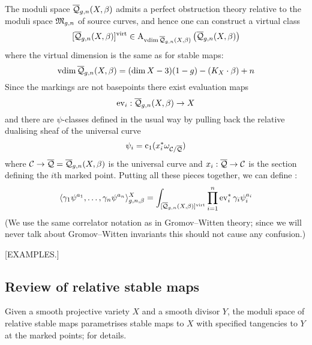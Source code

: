 The moduli space $\overline{\mathcal Q}_{g,n}(X,\beta)$ admits a perfect obstruction theory relative to the moduli space $\mathfrak M_{g,n}$ of source curves, and hence one can construct a virtual class
\begin{equation*} [\overline{\mathcal Q}_{g,n}(X,\beta)]^{\operatorname{virt}} \in \operatorname{A}_{\operatorname{vdim}\overline{\mathcal Q}_{g,n}(X,\beta)} \left( \overline{\mathcal Q}_{g,n}(X,\beta) \right) \end{equation*}
where the virtual dimension is the same as for stable maps:
\begin{equation*} \operatorname{vdim}\overline{\mathcal Q}_{g,n}(X,\beta) = (\dim{X} - 3)(1-g) - (K_X \cdot \beta) + n \end{equation*}
Since the markings are not basepoints there exist evaluation maps
\begin{equation*} \operatorname{ev}_i : \overline{\mathcal Q}_{g,n}(X,\beta) \rightarrow X \end{equation*}
and there are $\psi$-classes defined in the usual way by pulling back the relative dualising sheaf of the universal curve
\begin{equation*} \psi_i = \operatorname{c}_1(x_i^* \omega_{\mathcal{C}/\overline{\mathcal{Q}}}) \end{equation*}
where $\mathcal{C} \rightarrow \overline{\mathcal{Q}} = \overline{\mathcal Q}_{g,n}(X,\beta)$ is the universal curve and $x_i : \overline{\mathcal{Q}} \rightarrow \mathcal{C}$ is the section defining the $i$th marked point. Putting all these pieces together, we can define :
\begin{equation*} \langle \gamma_1 \psi^{a_1} , \ldots, \gamma_n \psi^{a_n} \rangle_{g,n,\beta}^X = \int_{[\overline{\mathcal Q}_{g,n}(X,\beta)]^{\operatorname{virt}}} \prod_{i=1}^n \operatorname{ev}_i^* \gamma_i \psi_i^{a_i} \end{equation*}
(We use the same correlator notation as in Gromov--Witten theory; since we will never talk about Gromov--Witten invariants this should not cause any confusion.)

[EXAMPLES.]

\subsection{Review of relative stable maps} \label{Subsection relative stable maps} Given a smooth projective variety $X$ and a smooth divisor $Y$, the moduli space of relative stable maps parametrises stable maps to $X$ with specified tangencies to $Y$ at the marked points; \cite{Ga} for details.

